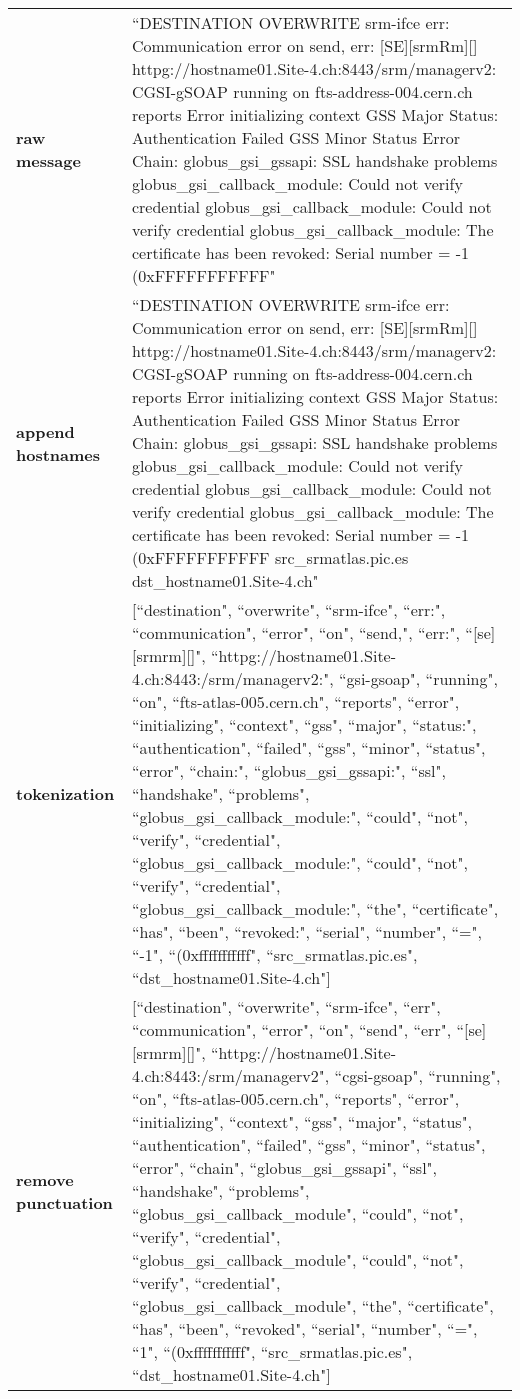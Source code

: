 \begin{table} \scriptsize
\begin{tabular}{p{1.9cm} | p{12cm}}
\textbf{raw message} &
  ``DESTINATION OVERWRITE srm-ifce err: Communication error on send, err:  {[}SE{]}{[}srmRm{]}{[}{]} httpg://hostname01.Site-4.ch:8443/srm/managerv2:  CGSI-gSOAP running on fts-address-004.cern.ch reports Error initializing  context GSS Major Status: Authentication Failed  GSS Minor Status Error  Chain: globus\_gsi\_gssapi: SSL handshake problems  globus\_gsi\_callback\_module: Could not verify credential  globus\_gsi\_callback\_module: Could not verify credential  globus\_gsi\_callback\_module: The certificate has been revoked: Serial  number = -1 (0xFFFFFFFFFFF" \\[0.2cm]
\textbf{append hostnames} &
   ``DESTINATION OVERWRITE srm-ifce err: Communication error on send, err:  {[}SE{]}{[}srmRm{]}{[}{]} httpg://hostname01.Site-4.ch:8443/srm/managerv2:  CGSI-gSOAP running on fts-address-004.cern.ch reports Error initializing  context GSS Major Status: Authentication Failed  GSS Minor Status Error  Chain: globus\_gsi\_gssapi: SSL handshake problems  globus\_gsi\_callback\_module: Could not verify credential  globus\_gsi\_callback\_module: Could not verify credential  globus\_gsi\_callback\_module: The certificate has been revoked: Serial  number = -1 (0xFFFFFFFFFFF src\_srmatlas.pic.es dst\_hostname01.Site-4.ch" \\[0.2cm]
\textbf{tokenization} &
   {[}``destination", ``overwrite", ``srm-ifce", ``err:", ``communication", ``error", ``on", ``send,", ``err:", ``{[}se{]}{[}srmrm{]}{[}{]}", ``httpg://hostname01.Site-4.ch:8443:/srm/managerv2:", ``gsi-gsoap", ``running", ``on", ``fts-atlas-005.cern.ch", ``reports", ``error", ``initializing", ``context", ``gss", ``major", ``status:", ``authentication", ``failed", ``gss", ``minor", ``status", ``error", ``chain:", ``globus\_gsi\_gssapi:", ``ssl", ``handshake", ``problems", ``globus\_gsi\_callback\_module:", ``could", ``not", ``verify", ``credential", ``globus\_gsi\_callback\_module:", ``could", ``not", ``verify", ``credential", ``globus\_gsi\_callback\_module:", ``the", ``certificate", ``has", ``been", ``revoked:", ``serial", ``number", ``=", ``-1", ``(0xfffffffffff", ``src\_srmatlas.pic.es", ``dst\_hostname01.Site-4.ch"{]} \\[0.2cm]
\textbf{remove punctuation} &
  {[}``destination", ``overwrite", ``srm-ifce", ``err", ``communication", ``error", ``on", ``send", ``err", ``{[}se{]}{[}srmrm{]}{[}{]}", ``httpg://hostname01.Site-4.ch:8443:/srm/managerv2", ``cgsi-gsoap", ``running", ``on", ``fts-atlas-005.cern.ch", ``reports", ``error", ``initializing", ``context", ``gss", ``major", ``status", ``authentication", ``failed", ``gss", ``minor", ``status", ``error", ``chain", ``globus\_gsi\_gssapi", ``ssl", ``handshake", ``problems", ``globus\_gsi\_callback\_module", ``could", ``not", ``verify", ``credential", ``globus\_gsi\_callback\_module", ``could", ``not", ``verify", ``credential", ``globus\_gsi\_callback\_module", ``the", ``certificate", ``has", ``been", ``revoked", ``serial", ``number", ``=", ``1", ``(0xfffffffffff", ``src\_srmatlas.pic.es", ``dst\_hostname01.Site-4.ch"{]} \\[0.2cm]

\end{tabular}
\end{table}
